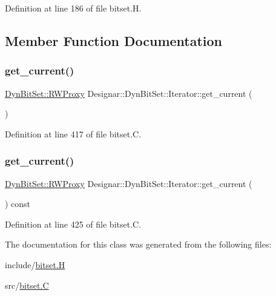 Definition at line 186 of file bitset.\+H.



\subsection{Member Function Documentation}
\mbox{\label{class_designar_1_1_dyn_bit_set_1_1_iterator_a413eba67b23a9400666c18845bbe795a}} 
\subsubsection{\texorpdfstring{get\+\_\+current()}{get\_current()}\hspace{0.1cm}{\footnotesize\ttfamily [1/2]}}
{\footnotesize\ttfamily \hyperlink{class_designar_1_1_dyn_bit_set_1_1_r_w_proxy}{Dyn\+Bit\+Set\+::\+R\+W\+Proxy} Designar\+::\+Dyn\+Bit\+Set\+::\+Iterator\+::get\+\_\+current (\begin{DoxyParamCaption}{ }\end{DoxyParamCaption})}



Definition at line 417 of file bitset.\+C.

\mbox{\label{class_designar_1_1_dyn_bit_set_1_1_iterator_a034af8ec4f70d792837cab4923799e9f}} 
\subsubsection{\texorpdfstring{get\+\_\+current()}{get\_current()}\hspace{0.1cm}{\footnotesize\ttfamily [2/2]}}
{\footnotesize\ttfamily \hyperlink{class_designar_1_1_dyn_bit_set_1_1_r_w_proxy}{Dyn\+Bit\+Set\+::\+R\+W\+Proxy} Designar\+::\+Dyn\+Bit\+Set\+::\+Iterator\+::get\+\_\+current (\begin{DoxyParamCaption}{ }\end{DoxyParamCaption}) const}



Definition at line 425 of file bitset.\+C.



The documentation for this class was generated from the following files\+:\begin{DoxyCompactItemize}
\item 
include/\hyperlink{bitset_8_h}{bitset.\+H}\item 
src/\hyperlink{bitset_8_c}{bitset.\+C}\end{DoxyCompactItemize}
